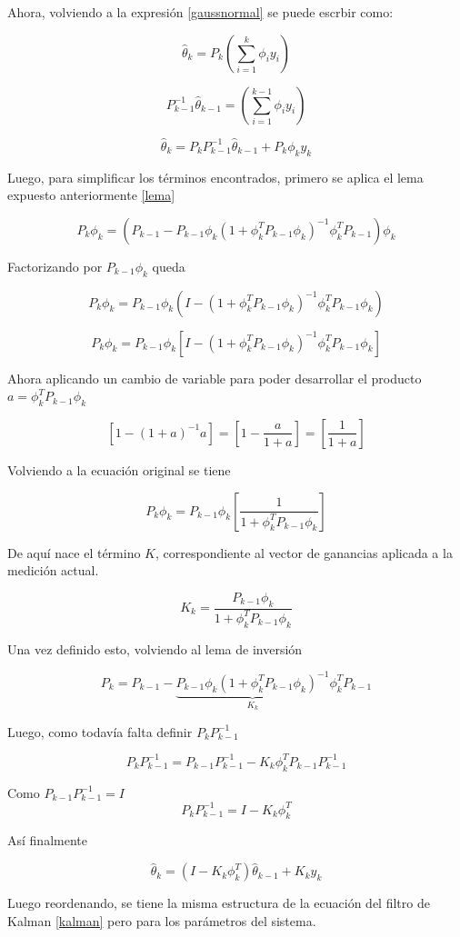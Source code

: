 Ahora, volviendo a la expresión \ref{gaussnormal} se puede escrbir como:

\[
  \hat{\theta}_k = P_k (\sum_{i=1}^{k} \phi_i y_i) 
\]

\[
  P_{k-1}^{-1}\hat{\theta}_{k-1} = (\sum_{i=1}^{k-1} \phi_i y_i) 
\]


\[
  \hat{\theta}_k = P_kP_{k-1}^{-1}\hat{\theta}_{k-1} + P_k\phi_k y_k 
\]

Luego, para simplificar los términos encontrados, primero se aplica el lema expuesto anteriormente \ref{lema}

\[
P_k\phi_k = (P_{k-1} - P_{k-1}\phi_k(1 +  \phi_k^TP_{k-1}\phi_k)^{-1}\phi_k^TP_{k-1})\phi_k
\]

Factorizando por $P_{k-1}\phi_k$ queda

\[
P_k\phi_k = P_{k-1}\phi_k(I - (1 +  \phi_k^TP_{k-1}\phi_k)^{-1}\phi_k^TP_{k-1}\phi_k)
\]


\[
  P_k\phi_k = P_{k-1}\phi_k[I - (1 +  \phi_k^TP_{k-1}\phi_k)^{-1}\phi_k^TP_{k-1}\phi_k]
\]

Ahora aplicando un cambio de variable para poder desarrollar el producto $a = \phi_k^TP_{k-1}\phi_k$

\[
  [1 - (1 + a)^{-1}a] = [1 - \frac{a}{1 + a}] = [\frac{1}{1 + a}]
\]

Volviendo a la ecuación original se tiene

\[
P_k\phi_k = P_{k-1}\phi_k[\frac{1}{1 + \phi_k^TP_{k-1}\phi_k}]
\]

De aquí nace el término $K$, correspondiente al vector de ganancias aplicada a la medición actual.

\[
 K_k = \frac{P_{k-1}\phi_k}{1 + \phi_k^TP_{k-1}\phi_k}
\]

Una vez definido esto, volviendo al lema de inversión

\[
P_k = P_{k-1}
- \underbrace{P_{k-1}\phi_k(1+\phi_k^T P_{k-1}\phi_k)^{-1}}_{K_k}
\phi_k^T P_{k-1}
\]

Luego, como todavía falta definir $P_kP_{k-1}^{-1}$

\[
  P_kP_{k-1}^{-1} = P_{k-1}P_{k-1}^{-1} - K_k\phi_k^T P_{k-1}P_{k-1}^{-1}
\]

Como $P_{k-1}P_{k-1}^{-1} = I$
\[
  P_kP_{k-1}^{-1} = I - K_k\phi_k^T 
\]

Así finalmente


\[
  \hat{\theta}_k = (I - K_k\phi_k^T)\hat{\theta}_{k-1} + K_k y_k 
\]

Luego reordenando, se tiene la misma estructura de la ecuación del filtro de Kalman \ref{kalman} pero para los parámetros del sistema.

